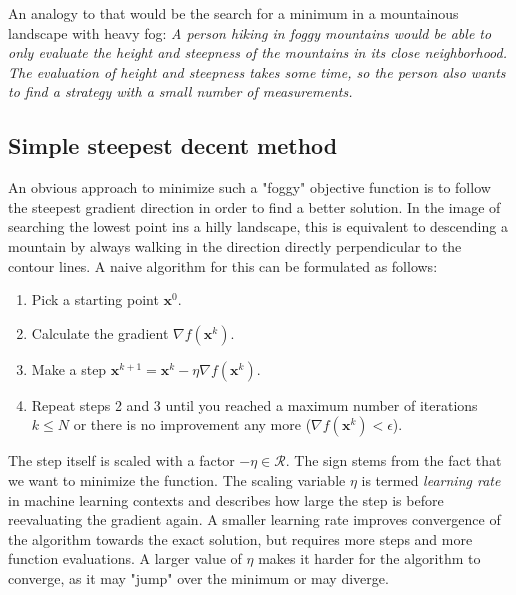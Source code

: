 An analogy to that would be the search for a minimum in a mountainous landscape with heavy fog: \emph{A person hiking in foggy mountains would be able to only evaluate the height and steepness of the mountains in its close neighborhood. The evaluation of height and steepness takes some time, so the person also wants to find a strategy with a small number of measurements.}

\subsection{Simple steepest decent method}
An obvious approach to minimize such a "foggy" objective function is to follow the steepest gradient direction in order to find a better solution. In the image of searching the lowest point ins a hilly landscape, this is equivalent to descending a mountain by always walking in the direction directly perpendicular to the contour lines. 
A naive algorithm for this can be formulated as follows:
\begin{enumerate}
    \item Pick a starting point $\mathbf{x}^0$.
    \item Calculate the gradient $\nabla f(\mathbf{x}^k)$.
    \item Make a step $\mathbf{x}^{k+1} = \mathbf{x}^k -\eta \nabla f(\mathbf{x}^k)$.
    \item Repeat steps 2 and 3 until you reached a maximum number of iterations $k \le N$ or there is no improvement any more ($ \nabla f(\mathbf{x}^k) < \epsilon$). 
\end{enumerate}
The step itself is scaled with a factor $-\eta \in \mathcal{R}$. The sign stems from the fact that we want to minimize the function. The scaling variable $\eta$ is termed \emph{learning rate} in machine learning contexts and describes how large the step is before reevaluating the gradient again. A smaller learning rate improves convergence of the algorithm towards the exact solution, but requires more steps and more function evaluations. A larger value of $\eta$ makes it harder for the algorithm to converge, as it may "jump" over the minimum or may diverge. 

